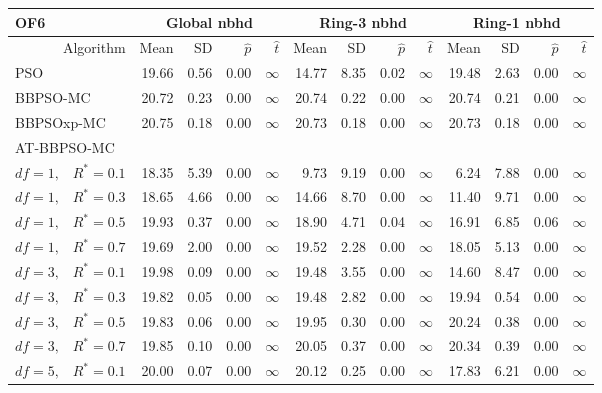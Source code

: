 \documentclass[12pt]{article}
\begin{document}
\begin{table}[ht]
\centering
\tiny{
\begin{tabular}{r|rrrr|rrrr|rrrr}
\multicolumn{1}{l}{OF6} & \multicolumn{4}{c}{Global nbhd} & \multicolumn{4}{c}{Ring-3 nbhd} & \multicolumn{4}{c}{Ring-1 nbhd}\\
  \hline
Algorithm & Mean & SD & $\widehat{p}$ & $\widehat{t}$ & Mean & SD & $\widehat{p}$ & $\widehat{t}$ & Mean & SD & $\widehat{p}$ & $\widehat{t}$ \\ 
  \hline
\multicolumn{1}{l|}{PSO} & 19.66 & 0.56 & 0.00 & $\infty$ & 14.77 & 8.35 & 0.02 & $\infty$ & 19.48 & 2.63 & 0.00 & $\infty$ \\ 
  \multicolumn{1}{l|}{BBPSO-MC} & 20.72 & 0.23 & 0.00 & $\infty$ & 20.74 & 0.22 & 0.00 & $\infty$ & 20.74 & 0.21 & 0.00 & $\infty$ \\ 
  \multicolumn{1}{l|}{BBPSOxp-MC} & 20.75 & 0.18 & 0.00 & $\infty$ & 20.73 & 0.18 & 0.00 & $\infty$ & 20.73 & 0.18 & 0.00 & $\infty$ \\ 
\hline
\multicolumn{1}{l|}{AT-BBPSO-MC} &&&&&&&&&&&&\\
  $df = 1,\enspace$ $R^* =0.1$ & 18.35 & 5.39 & 0.00 & $\infty$ & 9.73 & 9.19 & 0.00 & $\infty$ & 6.24 & 7.88 & 0.00 & $\infty$ \\ 
  $df = 1,\enspace$ $R^* =0.3$ & 18.65 & 4.66 & 0.00 & $\infty$ & 14.66 & 8.70 & 0.00 & $\infty$ & 11.40 & 9.71 & 0.00 & $\infty$ \\ 
  $df = 1,\enspace$ $R^* =0.5$ & 19.93 & 0.37 & 0.00 & $\infty$ & 18.90 & 4.71 & 0.04 & $\infty$ & 16.91 & 6.85 & 0.06 & $\infty$ \\ 
  $df = 1,\enspace$ $R^* =0.7$ & 19.69 & 2.00 & 0.00 & $\infty$ & 19.52 & 2.28 & 0.00 & $\infty$ & 18.05 & 5.13 & 0.00 & $\infty$ \\ 
  $df = 3,\enspace$ $R^* =0.1$ & 19.98 & 0.09 & 0.00 & $\infty$ & 19.48 & 3.55 & 0.00 & $\infty$ & 14.60 & 8.47 & 0.00 & $\infty$ \\ 
  $df = 3,\enspace$ $R^* =0.3$ & 19.82 & 0.05 & 0.00 & $\infty$ & 19.48 & 2.82 & 0.00 & $\infty$ & 19.94 & 0.54 & 0.00 & $\infty$ \\ 
  $df = 3,\enspace$ $R^* =0.5$ & 19.83 & 0.06 & 0.00 & $\infty$ & 19.95 & 0.30 & 0.00 & $\infty$ & 20.24 & 0.38 & 0.00 & $\infty$ \\ 
  $df = 3,\enspace$ $R^* =0.7$ & 19.85 & 0.10 & 0.00 & $\infty$ & 20.05 & 0.37 & 0.00 & $\infty$ & 20.34 & 0.39 & 0.00 & $\infty$ \\ 
  $df = 5,\enspace$ $R^* =0.1$ & 20.00 & 0.07 & 0.00 & $\infty$ & 20.12 & 0.25 & 0.00 & $\infty$ & 17.83 & 6.21 & 0.00 & $\infty$ \\ 

\end{tabular}}
\end{table}
\end{document}

